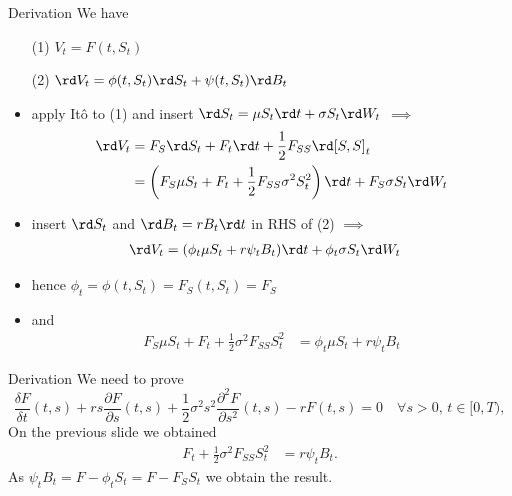 \documentclass[pdf, handout]{beamer}
\begin{document}
\begin{frame}{Derivation}
We have
\begin{itemize}
\item[(1)] $V_t=F(t,S_t)$
\item[(2)] $\rd V_t= \phi(t,S_t) \rd S_t + \psi(t,S_t) \rd B_t$
\end{itemize}
\vspace{-.2cm}
\begin{itemize}
\item apply It\^{o} to (1) and insert $\rd S_t = \mu S_t \rd t + \sigma S_t \rd W_t$  $\implies$
\begin{align*}
\rd V_t &= F_S \rd S_t + F_t \rd t + \frac{1}{2} F_{SS} \rd [S,S]_t 
\\
&=  \left( F_S \mu S_t +F_t +  \frac{1}{2} F_{SS} \sigma^2 S_t^2  \right) 
\rd t + F_S \sigma S_t \rd W_t 
\end{align*}
\item insert $\rd S_t$ and $\rd B_t=rB_t\rd t$ in RHS of (2) $\implies$
\begin{align*}
\rd V_t &= (\phi_t \mu S_t + r\psi_t B_t) \rd t +  \phi_t \sigma S_t \rd W_t
\end{align*}
\item hence $\phi_t = \phi(t,S_t) = F_{S}(t,S_t)=F_S$
\item and
\begin{align*}
F_S \mu S_t +F_t +  \frac{1}{2}\sigma^2 F_{SS} S_t^2    
&= \phi_t \mu S_t + r\psi_t B_t
\end{align*}
\end{itemize}
\end{frame}



\begin{frame}{Derivation}
We need to prove
\[
\frac{\delta F}{\delta t}(t,s) + r s \frac{\partial F}{\partial
s}(t,s) + \frac{1}{2}\sigma^2 s^2 \frac{\partial^2 F}{\partial
s^2}(t,s) -r F(t,s)=0\quad \forall s>0,\,t\in[0, T),
\]
On the previous slide we obtained
\begin{align*}
F_t + \frac{1}{2}\sigma^2 F_{SS} S_t^2    
&=  r\psi_t B_t.
\end{align*}
As $\psi_t B_t = F - \phi_t S_t = F - F_S S_t$
we obtain the result.
\end{frame}
\end{document}
